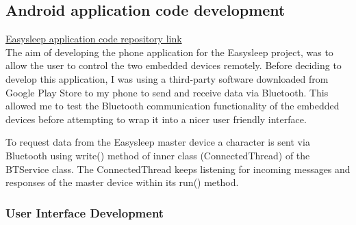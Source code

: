 \documentclass[12pt,a4paper]{article}
\begin{document}
    \subsection{Android application code development}
    \href{https://github.com/zedd-1983/Easysleep_app/tree/bt_connection_3}{Easysleep application code repository link}\\
    
    The aim of developing the phone application for the Easysleep project, was to allow the user to control the two embedded devices remotely. Before deciding to develop this application, I was using a third-party software downloaded from Google Play Store to my phone to send and receive data via Bluetooth. This allowed me to test the Bluetooth communication functionality of the embedded devices before attempting to wrap it into a nicer user friendly interface.
    
    To request data from the Easysleep master device a character is sent via Bluetooth using write() method of inner class (ConnectedThread) of the BTService class. The ConnectedThread keeps listening for incoming messages and responses of the master device within its run() method. 
                
    \subsubsection{User Interface Development}
    
\end{document}
